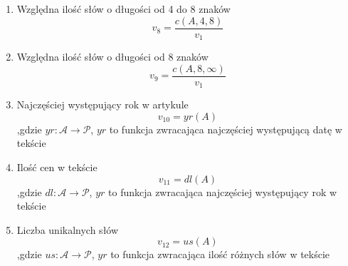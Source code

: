 \documentclass{classrep}
\begin{document}
\begin{enumerate}
\item Względna ilość słów o długości od 4 do 8 znaków
\begin{equation}
v_{8}=\frac{c(A,4,8)}{v_1}\label{eq:eps}
\end{equation}


\item Względna ilość słów o długości od 8 znaków
\begin{equation}
v_{9}=\frac{c(A,8,\infty)}{v_1}\label{eq:eps}
\end{equation}

\item Najczęściej występujący rok w artykule
\begin{equation}
v_{10}=yr(A)\label{eq:eps}
\end{equation}
,gdzie
\newline $yr:\mathcal{A}\rightarrow\mathcal{P}$, $yr$ to funkcja zwracająca najczęściej występującą datę w tekście


\item Ilość cen w tekście
\begin{equation}
v_{11}=dl(A)\label{eq:eps}
\end{equation}
,gdzie
\newline $dl:\mathcal{A}\rightarrow\mathcal{P}$, $yr$ to funkcja zwracająca najczęściej występujący rok w tekście


\item Liczba unikalnych słów
\begin{equation}
v_{12}=us(A)\label{eq:eps}
\end{equation}
,gdzie
\newline $us:\mathcal{A}\rightarrow\mathcal{P}$, $yr$ to funkcja zwracająca ilość różnych słów w tekście
\end{enumerate}
\end{document}
